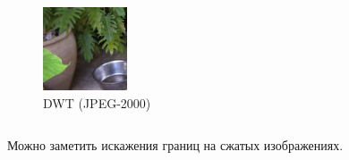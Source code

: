 \documentclass{beamer}
\begin{document}
\begin{frame}
\begin{columns}[T]
  \begin{column}{0.3\textwidth}
    \begin{figure}
      \includegraphics[width=\textwidth]{img/field/jp2k}
      \caption{DWT (JPEG-2000)}
    \end{figure}
  \end{column}

\end{columns}

Можно заметить искажения границ на сжатых изображениях.

\end{frame}
\end{document}

